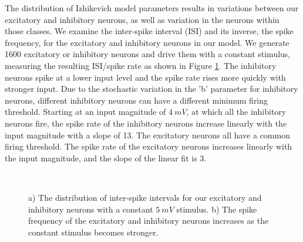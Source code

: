 \documentclass[12pt]{article}
\begin{document}
The distribution of Izhikevich model parameters results in variations between our excitatory and inhibitory neurons, as well as variation in the neurons within those classes.
We examine the inter-spike interval (ISI) and its inverse, the spike frequency, for the excitatory and inhibitory neurons in our model.
We generate 1600 excitatory or inhibitory neurons and drive them with a constant stimulus, measuring the resulting ISI/spike rate as shown in Figure \ref{fig:ISIstatistics}.
The inhibitory neurons spike at a lower input level and the spike rate rises more quickly with stronger input.
Due to the stochastic variation in the 'b' parameter for inhibitory neurons, different inhibitory neurons can have a different minimum firing threshold.
Starting at an input magnitude of $4\ mV$, at which all the inhibitory neurons fire, the spike rate of the inhibitory neurons increase linearly with the input magnitude with a slope of 13.
The excitatory neurons all have a common firing threshold.
The spike rate of the excitatory neurons increases linearly with the input magnitude, and the slope of the linear fit is 3.
\begin{figure}[!htb]
   \\
  \caption{a) The distribution of inter-spike intervals for our excitatory and inhibitory neurons with a constant $5\ mV$ stimulus.  
      b) The spike frequency of the excitatory and inhibitory neurons increases as the constant stimulus becomes stronger.}
  \label{fig:ISIstatistics}
\end{figure}
\FloatBarrier
\end{document}
